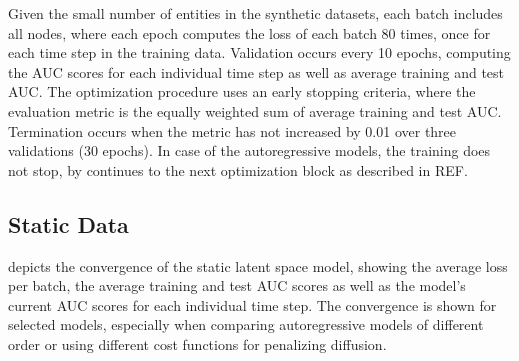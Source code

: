 Given the small number of entities in the synthetic datasets, each batch includes all nodes, where each epoch computes the loss of each batch 80 times, once for each time step in the training data. Validation occurs every 10 epochs, computing the AUC scores for each individual time step as well as average training and test AUC.
The optimization procedure uses an early stopping criteria, where the evaluation metric is the equally weighted sum of average training and test AUC. Termination occurs when the metric has not increased by 0.01 over three validations (30 epochs). In case of the autoregressive models, the training does not stop, by continues to the next optimization block as described in REF.



\subsection{Static Data}

     depicts the convergence of the static latent space model, showing the average loss per batch, the average training and test AUC scores as well as the model's current AUC scores for each individual time step. The convergence is shown for selected models, especially when comparing autoregressive models of different order or using different cost functions for penalizing diffusion.

    
    

